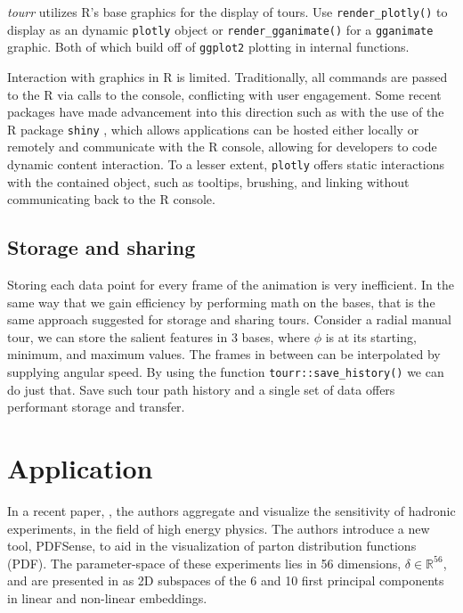 \documentclass{monashthesis}
\begin{document}
\emph{tourr} utilizes R's base graphics for the display of tours. Use
\texttt{render\_plotly()} to display as an dynamic \texttt{plotly}
\textcite{sievert_plotly_2018} object or \texttt{render\_gganimate()}
for a \texttt{gganimate} \textcite{pedersen_gganimate:_2019} graphic.
Both of which build off of \texttt{ggplot2} plotting in internal
functions.

Interaction with graphics in R is limited. Traditionally, all commands
are passed to the R via calls to the console, conflicting with user
engagement. Some recent packages have made advancement into this
direction such as with the use of the R package \texttt{shiny}
\autocite{chang_shiny:_2018}, which allows applications can be hosted
either locally or remotely and communicate with the R console, allowing
for developers to code dynamic content interaction. To a lesser extent,
\texttt{plotly} offers static interactions with the contained object,
such as tooltips, brushing, and linking without communicating back to
the R console.

\subsection{Storage and sharing}\label{storage-and-sharing}

Storing each data point for every frame of the animation is very
inefficient. In the same way that we gain efficiency by performing math
on the bases, that is the same approach suggested for storage and
sharing tours. Consider a radial manual tour, we can store the salient
features in 3 bases, where \(\phi\) is at its starting, minimum, and
maximum values. The frames in between can be interpolated by supplying
angular speed. By using the function \texttt{tourr::save\_history()} we
can do just that. Save such tour path history and a single set of data
offers performant storage and transfer.

\section{Application}\label{sec:application}

In a recent paper, \textcite{wang_visualizing_2018}, the authors
aggregate and visualize the sensitivity of hadronic experiments, in the
field of high energy physics. The authors introduce a new tool,
PDFSense, to aid in the visualization of parton distribution functions
(PDF). The parameter-space of these experiments lies in 56 dimensions,
\(\delta \in \mathbb{R}^{56}\), and are presented in as 2D subspaces of
the 6 and 10 first principal components in linear and non-linear
embeddings.
\end{document}
